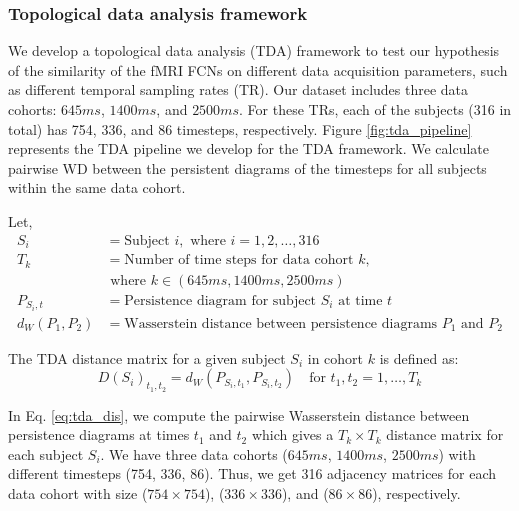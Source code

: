 \subsubsection{Topological data analysis framework}
\label{sec:tda_pipeline}



We develop a topological data analysis (TDA) framework to test our hypothesis of the similarity of the fMRI FCNs on different data acquisition parameters, such as different temporal sampling rates (TR). Our dataset includes three data cohorts: $645ms$, $1400ms$, and $2500ms$. For these TRs, each of the subjects (316 in total) has 754, 336, and 86 timesteps, respectively. Figure \ref{fig:tda_pipeline} represents the TDA pipeline we develop for the TDA framework. We calculate pairwise WD between the persistent diagrams of the timesteps for all subjects within the same data cohort. 

Let,
\begin{align*}
S_i & = \text{Subject } i, \text{ where } i = 1,2,\ldots,316 \\
T_k & = \text{Number of time steps for data cohort } k, 
\\
& \text{ where } k\in(645ms, 1400ms, 2500ms) \\
P_{S_i,t} & = \text{Persistence diagram for subject } S_i \text{ at time } t \\
d_W(P_1,P_2) & = \text{Wasserstein distance between persistence diagrams } P_1 \text{ and } P_2
\end{align*}

The TDA distance matrix for a given subject $S_i$ in cohort $k$ is defined as:
\begin{equation}
D(S_i)_{t_1,t_2} = d_W(P_{S_i,t_1}, P_{S_i,t_2}) \quad \text{for } t_1, t_2 = 1, \ldots, T_k \label{eq:tda_dis}
\end{equation}

In Eq. \ref{eq:tda_dis}, we compute the pairwise Wasserstein distance between persistence diagrams at times $t_1$ and $t_2$ which gives a $T_k \times T_k$ distance matrix for each subject $S_i$. We have three data cohorts ($645ms$, $1400ms$, $2500ms$) with different timesteps (754, 336, 86). Thus, we get 316 adjacency matrices for each data cohort with size ($754 \times 754$), ($336 \times 336$), and ($86 \times 86$), respectively.

